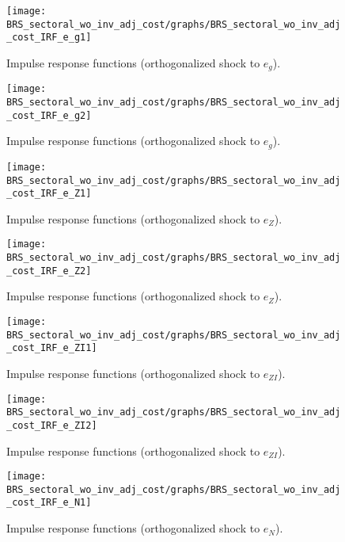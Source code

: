  
\begin{figure}[H]
\centering 
\texttt{[image: BRS\_sectoral\_wo\_inv\_adj\_cost/graphs/BRS\_sectoral\_wo\_inv\_adj\_cost\_IRF\_e\_g1]}
\caption{Impulse response functions (orthogonalized shock to ${e_g}$).}\label{Fig:IRF:e_g:1}
\end{figure}
 
\begin{figure}[H]
\centering 
\texttt{[image: BRS\_sectoral\_wo\_inv\_adj\_cost/graphs/BRS\_sectoral\_wo\_inv\_adj\_cost\_IRF\_e\_g2]}
\caption{Impulse response functions (orthogonalized shock to ${e_g}$).}\label{Fig:IRF:e_g:2}
\end{figure}
 
\begin{figure}[H]
\centering 
\texttt{[image: BRS\_sectoral\_wo\_inv\_adj\_cost/graphs/BRS\_sectoral\_wo\_inv\_adj\_cost\_IRF\_e\_Z1]}
\caption{Impulse response functions (orthogonalized shock to ${e_Z}$).}\label{Fig:IRF:e_Z:1}
\end{figure}
 
\begin{figure}[H]
\centering 
\texttt{[image: BRS\_sectoral\_wo\_inv\_adj\_cost/graphs/BRS\_sectoral\_wo\_inv\_adj\_cost\_IRF\_e\_Z2]}
\caption{Impulse response functions (orthogonalized shock to ${e_Z}$).}\label{Fig:IRF:e_Z:2}
\end{figure}
 
\begin{figure}[H]
\centering 
\texttt{[image: BRS\_sectoral\_wo\_inv\_adj\_cost/graphs/BRS\_sectoral\_wo\_inv\_adj\_cost\_IRF\_e\_ZI1]}
\caption{Impulse response functions (orthogonalized shock to ${e_{ZI}}$).}\label{Fig:IRF:e_ZI:1}
\end{figure}
 
\begin{figure}[H]
\centering 
\texttt{[image: BRS\_sectoral\_wo\_inv\_adj\_cost/graphs/BRS\_sectoral\_wo\_inv\_adj\_cost\_IRF\_e\_ZI2]}
\caption{Impulse response functions (orthogonalized shock to ${e_{ZI}}$).}\label{Fig:IRF:e_ZI:2}
\end{figure}
 
\begin{figure}[H]
\centering 
\texttt{[image: BRS\_sectoral\_wo\_inv\_adj\_cost/graphs/BRS\_sectoral\_wo\_inv\_adj\_cost\_IRF\_e\_N1]}
\caption{Impulse response functions (orthogonalized shock to ${e_N}$).}\label{Fig:IRF:e_N:1}
\end{figure}
 
